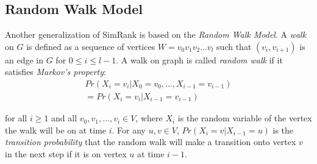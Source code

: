 \documentclass[conference]{IEEEtran}
\theoremstyle{definition}
\theoremstyle{definition}
\begin{document}
\subsection{Random Walk Model}
Another generalization of SimRank is based on the {\em Random Walk Model}. 
A \emph{walk} on $G$ is defined as a sequence of vertices $W=v_0v_1v_2\dots v_l$ such that $(v_i, v_{i+1})$ is an edge in $G$ for $0 \leq i \leq l-1$. 
A walk on graph is called {\em random walk} if it satisfies {\em Markov's property}:
\begin{eqnarray}
\label{eq:three}
  Pr(X_i = v_i|X_{0} = v_{0},\dots, X_{i-1}  = v_{i-1}) \nonumber \\  
 =  Pr(X_i = v_i|X_{i-1} = v_{i-1})
\end{eqnarray}
\iffalse
\begin{equation}
  Pr(X_i = v_i|X_{0} = v_{0},\dots, X_{i-1} = v_{i-1}) \\
=  Pr(X_i = v_i|X_{i-1} = v_{i-1})
\end{equation}
\fi
for all $i \geq1$  and all  $v_0, v_1, \dots, v_i \in V$, where $X_i$ is  the random variable of the vertex the walk will be on at time $i$.
 For any $u, v \in V$, $Pr(X_i=v|X_{i-1}=u)$ is the {\em transition probability} that the random walk will make a transition  onto vertex $v$ in the next step if it is on vertex $u$ at time $i-1$.
\end{document}
